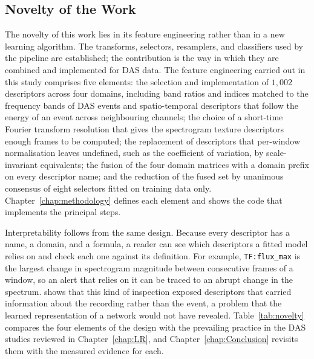 \subsection{Novelty of the Work}
\label{sec:ThesisNovelty}
The novelty of this work lies in its feature engineering rather than in a new learning algorithm. The transforms, selectors, resamplers, and classifiers used by the pipeline are established; the contribution is the way in which they are combined and implemented for DAS data. The feature engineering carried out in this study comprises five elements: the selection and implementation of $1{,}002$ descriptors across four domains, including band ratios and indices matched to the frequency bands of DAS events and spatio-temporal descriptors that follow the energy of an event across neighbouring channels; the choice of a short-time Fourier transform resolution that gives the spectrogram texture descriptors enough frames to be computed; the replacement of descriptors that per-window normalisation leaves undefined, such as the coefficient of variation, by scale-invariant equivalents; the fusion of the four domain matrices with a domain prefix on every descriptor name; and the reduction of the fused set by unanimous consensus of eight selectors fitted on training data only. Chapter~\ref{chap:methodology} defines each element and shows the code that implements the principal steps.

Interpretability follows from the same design. Because every descriptor has a name, a domain, and a formula, a reader can see which descriptors a fitted model relies on and check each one against its definition. For example, \texttt{TF:flux\_max} is the largest change in spectrogram magnitude between consecutive frames of a window, so an alert that relies on it can be traced to an abrupt change in the spectrum.  shows that this kind of inspection exposed descriptors that carried information about the recording rather than the event, a problem that the learned representation of a network would not have revealed. Table~\ref{tab:novelty} compares the four elements of the design with the prevailing practice in the DAS studies reviewed in Chapter~\ref{chap:LR}, and Chapter~\ref{chap:Conclusion} revisits them with the measured evidence for each.

